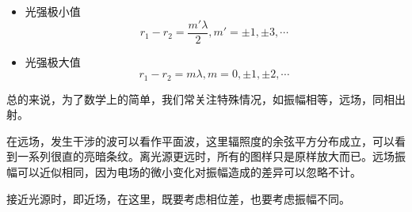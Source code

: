 \begin{corollary}{}

\begin{itemize}
\item 光强极小值 
\begin{equation}
r_1 - r_2 = \dfrac{ m' \lambda} { 2 } , m' = \pm 1, \pm 3, \cdots~
\end{equation}

\item 光强极大值 
\begin{equation}\label{eq_IntCos_1}
 r_1 - r_2 = m \lambda , m = 0 , \pm 1, \pm 2,\cdots ~
\end{equation}

\end{itemize}

\end{corollary}


总的来说，为了数学上的简单，我们常关注特殊情况，如振幅相等，远场，同相出射。

在远场，发生干涉的波可以看作平面波，这里辐照度的余弦平方分布成立，可以看到一系列很直的亮暗条纹。离光源更远时，所有的图样只是原样放大而已。远场振幅可以近似相同，因为电场的微小变化对振幅造成的差异可以忽略不计。

接近光源时，即近场，在这里，既要考虑相位差，也要考虑振幅不同。








